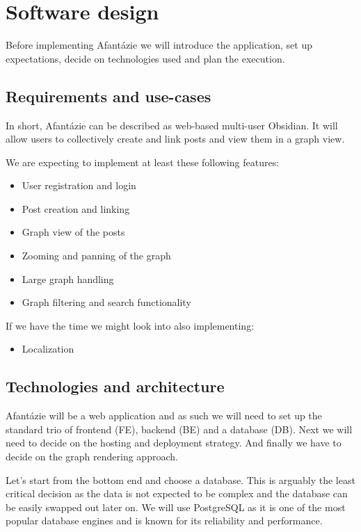 \chapter{Software design}

Before implementing Afantázie we will introduce the application, set up expectations, decide on technologies used and plan the execution.

\section{Requirements and use-cases}

In short, Afantázie can be described as web-based multi-user Obsidian.
It will allow users to collectively create and link posts and view them in a graph view.

We are expecting to implement at least these following features:
\begin{itemize}
  \item User registration and login
  \item Post creation and linking
  \item Graph view of the posts
  \item Zooming and panning of the graph
  \item Large graph handling
  \item Graph filtering and search functionality
\end{itemize}

If we have the time we might look into also implementing:
\begin{itemize}
    \item Localization
\end{itemize}

\section{Technologies and architecture}

Afantázie will be a web application and as such we will need to set up the standard trio of frontend (FE), backend (BE) and a database (DB).
Next we will need to decide on the hosting and deployment strategy.
And finally we have to decide on the graph rendering approach.

Let's start from the bottom end and choose a database.
This is arguably the least critical decision as the data is not expected to be complex and the database can be easily swapped out later on.
We will use PostgreSQL as it is one of the most popular database engines and is known for its reliability and performance.

